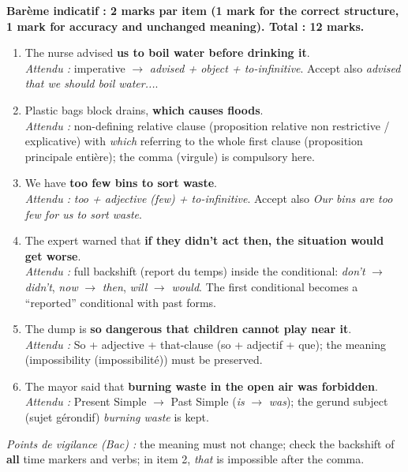 \documentclass[11pt]{article}
\newcommand{\cle}[1]{{\popxbold\color{popdark}#1}}
\begin{document}
\begin{corrige}
\textbf{Barème indicatif : 2 marks par item (1 mark for the correct structure, 1 mark for accuracy and unchanged meaning). Total : 12 marks.}
\begin{enumerate}
\item The nurse advised \textbf{us to boil water before drinking it}. \\
\emph{Attendu :} imperative $\to$ \emph{advised + object + to-infinitive}. Accept also \emph{advised that we should boil water...}.
\item Plastic bags block drains, \textbf{which causes floods}. \\
\emph{Attendu :} \cle{non-defining relative clause (proposition relative non restrictive / explicative)} with \emph{which} referring to the \cle{whole first clause (proposition principale entière)}; the \cle{comma (virgule)} is compulsory here.
\item We have \textbf{too few bins to sort waste}. \\
\emph{Attendu :} \emph{too + adjective (few) + to-infinitive}. Accept also \emph{Our bins are too few for us to sort waste}.
\item The expert warned that \textbf{if they didn't act then, the situation would get worse}. \\
\emph{Attendu :} full \cle{backshift (report du temps)} inside the conditional: \emph{don't} $\to$ \emph{didn't}, \emph{now} $\to$ \emph{then}, \emph{will} $\to$ \emph{would}. The first conditional becomes a ``reported'' conditional with past forms.
\item The dump is \textbf{so dangerous that children cannot play near it}. \\
\emph{Attendu :} \cle{So + adjective + that-clause (so + adjectif + que)}; the meaning (\cle{impossibility (impossibilité)}) must be preserved.
\item The mayor said that \textbf{burning waste in the open air was forbidden}. \\
\emph{Attendu :} Present Simple $\to$ Past Simple (\emph{is} $\to$ \emph{was}); the \cle{gerund subject (sujet gérondif)} \emph{burning waste} is kept.
\end{enumerate}
\emph{Points de vigilance (Bac) :} the meaning must not change; check the backshift of \textbf{all} time markers and verbs; in item 2, \emph{that} is impossible after the comma.
\end{corrige}
\end{document}
